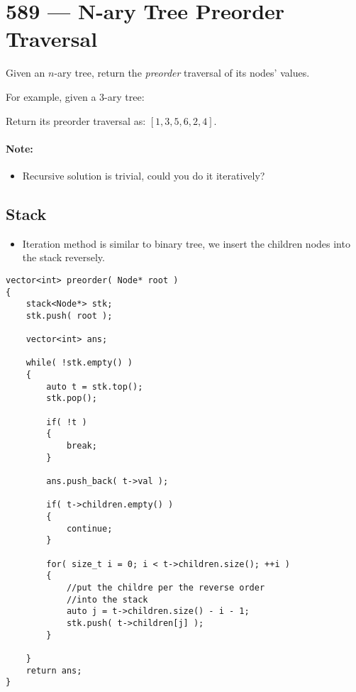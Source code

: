 \section{589 --- N-ary Tree Preorder Traversal}
Given an $n$-ary tree, return the \textit{preorder} traversal of its nodes' values.

For example, given a 3-ary tree:

\begin{figure}[H]
\end{figure}

Return its preorder traversal as: $[1,3,5,6,2,4]$.


\paragraph{Note:}

\begin{itemize}
\item Recursive solution is trivial, could you do it iteratively?
\end{itemize}

\subsection{Stack}
\begin{itemize}
\item Iteration method is similar to binary tree, we insert the children nodes into the stack reversely.
\end{itemize}

\setcounter{lstlisting}{0}
\begin{lstlisting}[style=customc, caption={Stack}]
vector<int> preorder( Node* root )
{
    stack<Node*> stk;
    stk.push( root );

    vector<int> ans;

    while( !stk.empty() )
    {
        auto t = stk.top();
        stk.pop();

        if( !t )
        {
            break;
        }

        ans.push_back( t->val );

        if( t->children.empty() )
        {
            continue;
        }

        for( size_t i = 0; i < t->children.size(); ++i )
        {
            //put the childre per the reverse order
            //into the stack
            auto j = t->children.size() - i - 1;
            stk.push( t->children[j] );
        }

    }
    return ans;
}
\end{lstlisting}